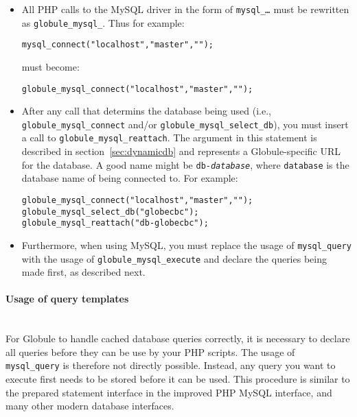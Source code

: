 \documentclass[10pt,a4paper]{article}
\makeatletter
\newenvironment{p}{\@open{P}{}}{\@close{P}}
\newenvironment{p}{}{\par}
\makeatother
\begin{document}
\begin{p}
\begin{itemize}
\item All PHP calls to the MySQL driver in the form of
\texttt{mysql\_\textit{\ldots}} must be rewritten as \texttt{globule\_mysql\_}.
Thus for example:

\begin{Verbatim}
mysql_connect("localhost","master","");
\end{Verbatim}
must become:
\begin{Verbatim}
globule_mysql_connect("localhost","master","");
\end{Verbatim}

\item After any call that determins the database being used (i.e.,
  \texttt{globule\_mysql\_connect} and/or
  \texttt{globule\_mysql\_select\_db}), you must insert a call to
  \texttt{globule\_mysql\_reattach}. The argument in this statement is
  described in section~\ref{sec:dynamicdb} and represents a
  Globule-specific URL for the database. A good name might be
  \texttt{db-\textit{database}}, where \texttt{database} is the
  database name of being connected to.  For example:
\begin{Verbatim}
globule_mysql_connect("localhost","master","");
globule_mysql_select_db("globecbc");
globule_mysql_reattach("db-globecbc");
\end{Verbatim}
\item Furthermore, when using MySQL, you must replace the usage of
  \texttt{mysql\_query} with the usage of
  \texttt{globule\_mysql\_execute} and declare the queries being made
  first, as described next.
\end{itemize}
\end{p}

\paragraph{Usage of query templates}~\\

\begin{p}
For Globule to handle cached database queries correctly, it is
necessary to declare all queries before they can be use by your PHP
scripts. The usage of \texttt{mysql\_query} is therefore not directly
possible.  Instead, any query you want to execute first needs to be
stored before it can be used.  This procedure is similar to the
prepared statement interface in the improved PHP MySQL interface, and
many other modern database interfaces.
\end{p}
\end{document}
